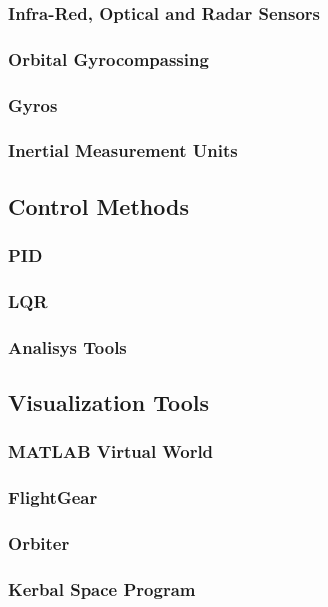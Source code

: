 \documentclass{article}
\begin{document}
\subsubsection{Infra-Red, Optical and Radar Sensors}
\subsubsection{Orbital Gyrocompassing}
\subsubsection{Gyros}
\subsubsection{Inertial Measurement Units}
\subsection{Control Methods}
\subsubsection{PID}
\subsubsection{LQR}
\subsubsection{Analisys Tools}
\subsection{Visualization Tools}
\subsubsection{MATLAB Virtual World}
\subsubsection{FlightGear}
\subsubsection{Orbiter}
\subsubsection{Kerbal Space Program}
\section{}
\end{document}
